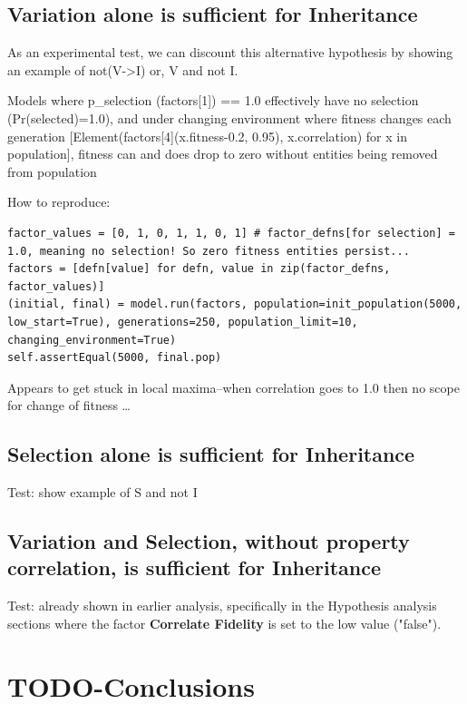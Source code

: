 \section{Variation alone is sufficient for Inheritance}\label{variation-alone-sufficient-for-inheritance -- v-i}

As an experimental test, we can discount this alternative hypothesis by showing an example of not(V-\textgreater{}I) or, V and not I.

Models where p\_selection (factors{[}1{]}) == 1.0 effectively have no
selection (Pr(selected)=1.0), and under changing environment where
fitness changes each generation {[}Element(factors{[}4{]}(x.fitness-0.2,
0.95), x.correlation) for x in population{]}, fitness can and does drop
to zero without entities being removed from population

How to reproduce:

\begin{verbatim}
factor_values = [0, 1, 0, 1, 1, 0, 1] # factor_defns[for selection] = 1.0, meaning no selection! So zero fitness entities persist...
factors = [defn[value] for defn, value in zip(factor_defns, factor_values)]
(initial, final) = model.run(factors, population=init_population(5000, low_start=True), generations=250, population_limit=10, changing_environment=True)
self.assertEqual(5000, final.pop)
\end{verbatim}

Appears to get stuck in local maxima--when correlation goes to 1.0 then no scope for change of fitness \ldots{}

\section{Selection alone is sufficient for Inheritance}\label{selection-alone-sufficient-for-inheritance-s-i}

Test: show example of S and not I

\section{Variation and Selection, without property correlation, is sufficient for Inheritance}

Test: already shown in earlier analysis, specifically in the Hypothesis analysis sections where the factor \textbf{Correlate Fidelity} is set to the low value ("false").

\chapter{TODO-Conclusions}


